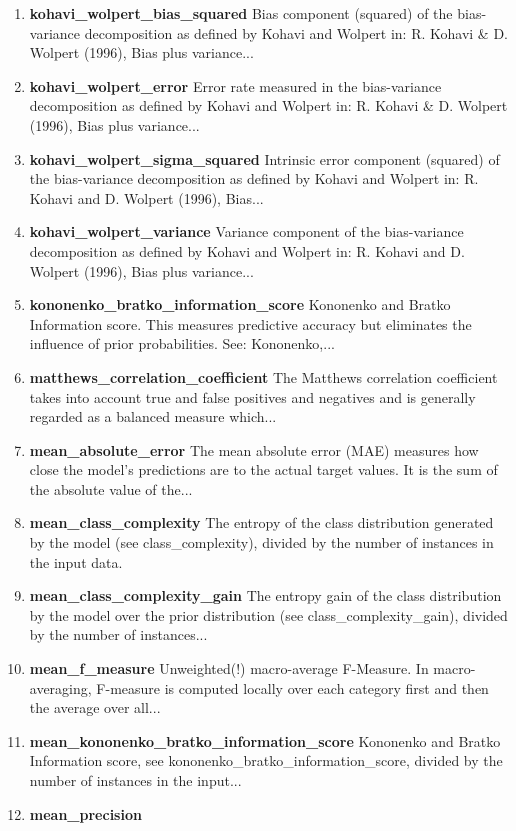 \documentclass[a4paper,12pt, english]{article}
\begin{document}
\begin{enumerate}
\item \textbf{kohavi\_wolpert\_bias\_squared}
Bias component (squared) of the bias-variance decomposition as defined by Kohavi and Wolpert in: R. Kohavi \& D. Wolpert (1996), Bias plus variance...
\item \textbf{kohavi\_wolpert\_error}
Error rate measured in the bias-variance decomposition as defined by Kohavi and Wolpert in: R. Kohavi \& D. Wolpert (1996), Bias plus variance...
\item \textbf{kohavi\_wolpert\_sigma\_squared}
Intrinsic error component (squared) of the bias-variance decomposition as defined by Kohavi and Wolpert in: R. Kohavi and D. Wolpert (1996), Bias...
\item \textbf{kohavi\_wolpert\_variance}
Variance component of the bias-variance decomposition as defined by Kohavi and Wolpert in: R. Kohavi and D. Wolpert (1996), Bias plus variance...
\item \textbf{kononenko\_bratko\_information\_score}
Kononenko and Bratko Information score. This measures predictive accuracy but eliminates the influence of prior probabilities. See: Kononenko,...
\item \textbf{matthews\_correlation\_coefficient}
The Matthews correlation coefficient takes into account true and false positives and negatives and is generally regarded as a balanced measure which...
\item \textbf{mean\_absolute\_error}
The mean absolute error (MAE) measures how close the model's predictions are to the actual target values. It is the sum of the absolute value of the...
\item \textbf{mean\_class\_complexity}
The entropy of the class distribution generated by the model (see class\_complexity), divided by the number of instances in the input data.
\item \textbf{mean\_class\_complexity\_gain}
The entropy gain of the class distribution by the model over the prior distribution (see class\_complexity\_gain), divided by the number of instances...
\item \textbf{mean\_f\_measure}
Unweighted(!) macro-average F-Measure. In macro-averaging, F-measure is computed locally over each category ﬁrst and then the average over all...
\item \textbf{mean\_kononenko\_bratko\_information\_score}
Kononenko and Bratko Information score, see kononenko\_bratko\_information\_score, divided by the number of instances in the input...
\item \textbf{mean\_precision}

\end{enumerate}
\end{document}
